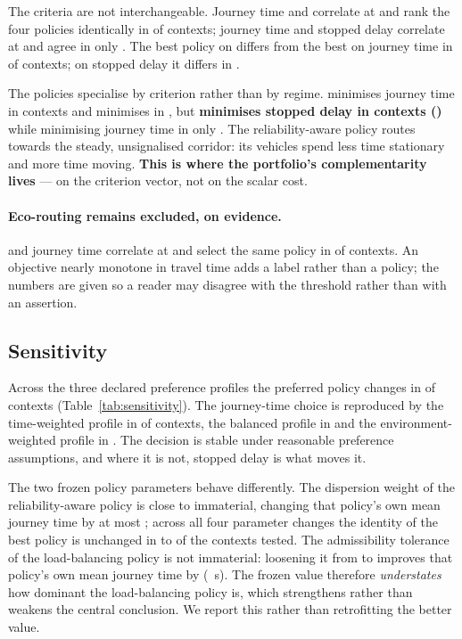 The criteria are not interchangeable. Journey time and \CO{} correlate at
\NumCorrCOneCTwo{} and rank the four policies identically in
\NumSameOrderCOneCTwo{} of contexts; journey time and stopped delay correlate at
\NumCorrCOneCThree{} and agree in only \NumSameOrderCOneCThree{}. The best
policy on \CO{} differs from the best on journey time in
\NumBestCTwoDiffersPct{} of contexts; on stopped delay it differs in
\NumBestCThreeDiffersPct{}.

The policies specialise by criterion rather than by regime.
\NumSpecCOnePolicy{} minimises journey time in \NumSpecCOneN{} contexts and
\NumSpecCTwoPolicy{} minimises \CO{} in \NumSpecCTwoN{}, but
\textbf{\NumSpecCThreePolicy{} minimises stopped delay in \NumSpecCThreeN{}
contexts (\NumSpecCThreePct{})} while minimising journey time in only
\NumSpecCOnePFour{}. The reliability-aware policy routes towards the steady,
unsignalised corridor: its vehicles spend less time stationary and more time
moving. \textbf{This is where the portfolio's complementarity lives} --- on the
criterion vector, not on the scalar cost.

\paragraph{Eco-routing remains excluded, on evidence.} \CO{} and journey time
correlate at \NumCorrCOneCTwo{} and select the same policy in
\NumSameOrderCOneCTwo{} of contexts. An objective nearly monotone in travel time
adds a label rather than a policy; the numbers are given so a reader may
disagree with the threshold rather than with an assertion.



\subsection{Sensitivity}
\label{sec:sensitivity}

Across the three declared preference profiles the preferred policy changes in
\NumPrefChanges{} of contexts (Table~\ref{tab:sensitivity}). The journey-time
choice is reproduced by the time-weighted profile in \NumPrefAgreeTime{} of
contexts, the balanced profile in \NumPrefAgreeBalanced{} and the
environment-weighted profile in \NumPrefAgreeEnvironment{}. The decision is
stable under reasonable preference assumptions, and where it is not, stopped
delay is what moves it.

The two frozen policy parameters behave differently. The dispersion weight of
the reliability-aware policy is close to immaterial, changing that policy's own
mean journey time by at most \NumLambdaMaxChangePct{}; across all four parameter
changes the identity of the best policy is unchanged in \NumWinnerStableMin{} to
\NumWinnerStableMax{} of the contexts tested. The admissibility tolerance of the
load-balancing policy is not immaterial: loosening it from \NumEpsFrozen{} to
\NumEpsAlt{} improves that policy's own mean journey time by \NumEpsGainPct{}
(\NumEpsGainSec~s). The frozen value therefore \emph{understates} how dominant
the load-balancing policy is, which strengthens rather than weakens the central
conclusion. We report this rather than retrofitting the better value.
